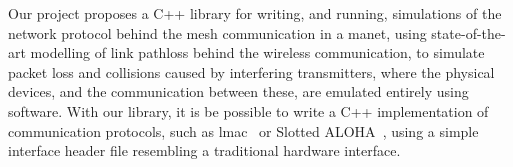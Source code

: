 Our project proposes a C++ library for writing, and running, simulations of the network protocol behind the mesh communication in a \gls{manet}, using state-of-the-art modelling of link \gls{pathloss} behind the wireless communication, to simulate packet loss and collisions caused by interfering transmitters, where the physical devices, and the communication between these, are emulated entirely using software. With our library, it is be possible to write a C++ implementation of communication protocols, such as \gls{lmac}~\cite{paper:lmac_protocol} or Slotted ALOHA~\cite{Roberts:1975:APS:1024916.1024920}, using a simple interface header file resembling a traditional hardware interface. \smallbreak




